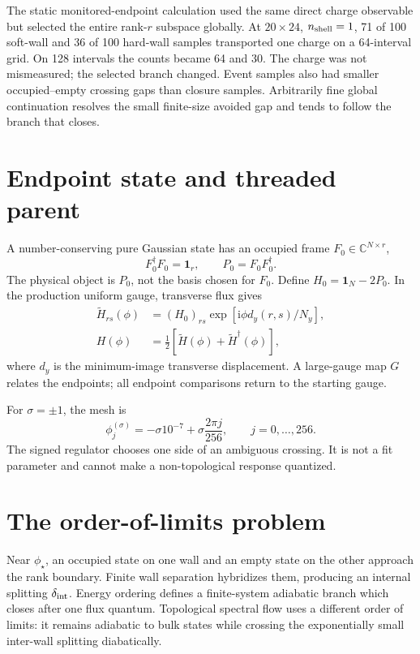 \documentclass[aps,prb,twocolumn,floatfix,nofootinbib]{revtex4-2}
\newcommand{\ii}{\mathrm{i}}
\begin{document}
The static monitored-endpoint calculation used the same direct charge
observable but selected the entire rank-$r$ subspace globally.  At
$20\times24$, $n_{\rm shell}=1$, 71 of 100 soft-wall and 36 of 100 hard-wall
samples transported one charge on a 64-interval grid.  On 128 intervals the
counts became 64 and 30.  The charge was not mismeasured; the selected branch
changed.  Event samples also had smaller occupied--empty crossing gaps than
closure samples.  Arbitrarily fine global continuation resolves the small
finite-size avoided gap and tends to follow the branch that closes.

\section{Endpoint state and threaded parent}

A number-conserving pure Gaussian state has an occupied frame
$F_0\in\mathbb{C}^{N\times r}$,
\begin{equation}
 F_0^\dagger F_0=\mathbf{1}_r,\qquad P_0=F_0F_0^\dagger .
\end{equation}
The physical object is $P_0$, not the basis chosen for $F_0$.  Define
$H_0=\mathbf{1}_N-2P_0$.  In the production uniform gauge, transverse flux
gives
\begin{align}
 \widetilde H_{rs}(\phi)&=(H_0)_{rs}
 \exp[\ii\phi d_y(r,s)/N_y],\\
 H(\phi)&=\tfrac12[\widetilde H(\phi)+\widetilde H^\dagger(\phi)],
 \label{eq:thread}
\end{align}
where $d_y$ is the minimum-image transverse displacement.  A large-gauge
map $G$ relates the endpoints; all endpoint comparisons return to the
starting gauge.

For $\sigma=\pm1$, the mesh is
\begin{equation}
 \phi_j^{(\sigma)}=-\sigma10^{-7}+\sigma\frac{2\pi j}{256},
 \qquad j=0,\ldots,256 .
 \label{eq:grid}
\end{equation}
The signed regulator chooses one side of an ambiguous crossing.  It is not a
fit parameter and cannot make a non-topological response quantized.

\section{The order-of-limits problem}

Near $\phi_\star$, an occupied state on one wall and an empty state on the
other approach the rank boundary.  Finite wall separation hybridizes them,
producing an internal splitting $\delta_{\rm int}$.  Energy ordering defines
a finite-system adiabatic branch which closes after one flux quantum.
Topological spectral flow uses a different order of limits: it remains
adiabatic to bulk states while crossing the exponentially small inter-wall
splitting diabatically.
\end{document}
